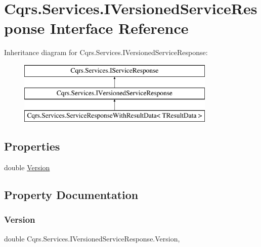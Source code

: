\hypertarget{interfaceCqrs_1_1Services_1_1IVersionedServiceResponse}{}\section{Cqrs.\+Services.\+I\+Versioned\+Service\+Response Interface Reference}
\label{interfaceCqrs_1_1Services_1_1IVersionedServiceResponse}
Inheritance diagram for Cqrs.\+Services.\+I\+Versioned\+Service\+Response\+:\begin{figure}[H]
\begin{center}
\leavevmode
\includegraphics[height=3.000000cm]{interfaceCqrs_1_1Services_1_1IVersionedServiceResponse}
\end{center}
\end{figure}
\subsection*{Properties}
\begin{DoxyCompactItemize}
\item 
double \hyperlink{interfaceCqrs_1_1Services_1_1IVersionedServiceResponse_a74db5cc9544e83d9855370ca8e3ac691}{Version}
\end{DoxyCompactItemize}


\subsection{Property Documentation}
\mbox{\label{interfaceCqrs_1_1Services_1_1IVersionedServiceResponse_a74db5cc9544e83d9855370ca8e3ac691}} 
\subsubsection{\texorpdfstring{Version}{Version}}
{\footnotesize\ttfamily double Cqrs.\+Services.\+I\+Versioned\+Service\+Response.\+Version\hspace{0.3cm}{\ttfamily [get]}, {\ttfamily [set]}}


